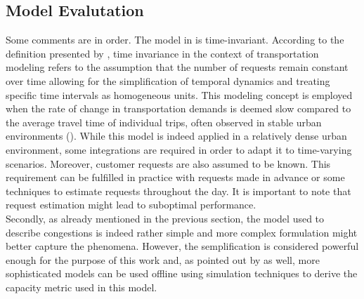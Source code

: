 \subsection{Model Evalutation}
Some comments are in order. The model in  is time-invariant. According to the definition presented by , time invariance in the context of transportation modeling refers to the assumption that the number of requests remain constant over time allowing for the simplification of temporal dynamics and treating specific time intervals as homogeneous units. This modeling concept is employed when the rate of change in transportation demands is deemed slow compared to the average travel time of individual trips, often observed in stable urban environments (\cite{neuburger1971}). While this model is indeed applied in a relatively dense urban environment, some integrations are required in order to adapt it to time-varying scenarios. Moreover, customer requests are also assumed to be known. This requirement can be fulfilled in practice with requests made in advance or some techniques to estimate requests throughout the day. It is important to note that request estimation might lead to suboptimal performance. \\
Secondly, as already mentioned in the previous section, the model used to describe congestions is indeed rather simple and more complex formulation might better capture the phenomena. However, the semplification is considered powerful enough for the purpose of this work and, as pointed out by  as well, more sophisticated models can be used offline using simulation techniques to derive the capacity metric used in this model.\\

